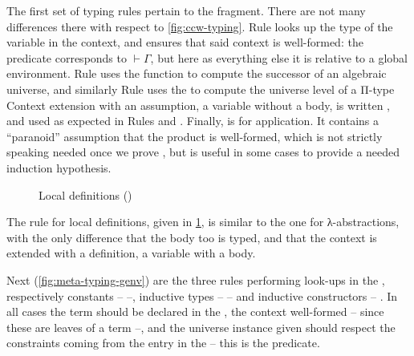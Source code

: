The first set of typing rules pertain to the  fragment. There are not many differences
there with respect to \cref{fig:ccw-typing}. Rule  looks up the type of the
variable in the context, and ensures that said context is well-formed:
the  predicate corresponds to $\vdash \Gamma$, but here as everything else it is
relative to a global environment. Rule  uses the  function to compute
the successor of an algebraic universe, and similarly Rule  uses the
 to compute the universe level of a Π-type%
Context extension with an assumption, \ie a variable without a body,
is written , and used as expected in Rules 
and . Finally,  is for application. It contains a “paranoid”
assumption that the product is well-formed, which is not strictly speaking needed once we
prove , but is useful in some cases to provide a needed induction hypothesis.

\begin{figure}
  \ContinuedFloat
  \caption{Local definitions ()}
  \label{fig:meta-typing-letin}
\end{figure}

The rule for local definitions, given in \cref{fig:meta-typing-letin}, is similar to the one
for λ-abstractions, with the only difference that the body too is typed, and that the context
is extended with a definition, \ie a variable with a body.

\begin{figure*}[h!]
  \ContinuedFloat
  \caption{Globally defined terms ()}
  \label{fig:meta-typing-genv}
\end{figure*}

Next (\cref{fig:meta-typing-genv}) are the three rules performing look-ups in
the , respectively constants –  –, inductive types –
 – and inductive constructors – . In all cases the
term should be declared in the , the context well-formed
– since these are leaves of a term –,
and the universe instance given should respect the constraints coming from the
entry in the  – this is the  predicate.

